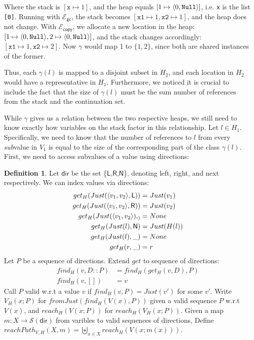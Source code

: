 \documentclass{easychair}
\newcommand{\ms}[1]{\ensuremath{\mathsf{#1}}}
\newcommand{\irl}[1]{\mathtt{#1}}
\newcommand{\gcSem}{\ensuremath{\mathcal{E}_{\ms{gc}}}}
\newcommand{\copySem}{\ensuremath{\mathcal{E}_{\ms{copy}}}}
\theoremstyle{definition}
\newtheorem{definition}{Definition}
\begin{document}
Where the stack is $[\texttt{x} \mapsto 1]$, and the heap equals 
$[1 \mapsto \pairexcst{0}{\irl{Null}}]$, i.e. \texttt{x} is the list \texttt{[0]}.
Running with \gcSem, the stack becomes 
$[\texttt{x1} \mapsto 1,\texttt{x2} \mapsto 1]$, and the heap does not change. With 
\copySem, we allocate a new location in the heap:
$[1 \mapsto \pairexcst{0}{\irl{Null}},2 \mapsto \pairexcst{0}{\irl{Null}}]$, and the 
stack changes accordingly: $[\texttt{x1} \mapsto 1,\texttt{x2} \mapsto 2]$.
Now $\gamma$ would map 1 to $\{1,2\}$, since both are shared instances of the former.

Thus, each $\gamma(l)$ is mapped to a disjoint subset in $H_2$, and each location in $H_2$ 
would have a representative in $H_1$. Furthermore, we noticed it is crucial to include the 
fact that the size of $\gamma(l)$ must be the sum number of references from the stack and 
the continuation set. 

While $\gamma$ gives us a relation between the two respective heaps, we still need to know 
exactly how variables on the stack factor in this relationship. Let $l \in H_1$. 
Specifically, we need to know that the number of references to $l$ from every \emph{sub}value
in $V_1$ is equal to the size of the corresponding part of the class $\gamma(l)$.  
First, we need to access 
subvalues of a value using directions: 

\begin{definition}
	Let \ms{dir} be the set \{\ms{L},\ms{R},\ms{N}\}, denoting left, right, and next 
	respectively. We can index values via directions:
	\begin{align*}
		get_H(Just(\pairexcst{v_1}{v_2},\ms{L})) &= Just(v_1)\\
		get_H(Just(\pairexcst{v_1}{v_2},\ms{R})) &= Just(v_2)\\
		get_H(Just(\pairexcst{v_1}{v_2}),_) &= None\\
		get_H(Just(l),\ms{N}) &= Just(H(l)) \\
		get_H(Just(l), \_) &= None\\
		get_H(r,\_) &= r
	\end{align*}
	Let $P$ be a sequence of directions. Extend $get$ to sequence of directions:
	\begin{align*}
		find_H(v,D::P) &= find_H(get_H(v,D),P)\\
		find_H(v,[]) &= v
	\end{align*}
	Call $P$ valid w.r.t a value $v$ if $find_H(v,P) = Just (v')$ for some $v'$.
	Write $V_H(x;P)$ for $fromJust(find_H(V(x),P))$ given a valid sequence $P$ w.r.t $V(x)$,
	and $reach_H(V(x;P))$ for $reach_H(V_H(x;P))$.
	Given a map $m : X \to \mathcal{S}(\ms{dir})$ from varibles to valid sequences of directions, 
	Define $reachPath_{V,H}(X,m) = \biguplus_{x \in X} reach_H(V(x;m(x)))$.
\end{definition}
\end{document}
